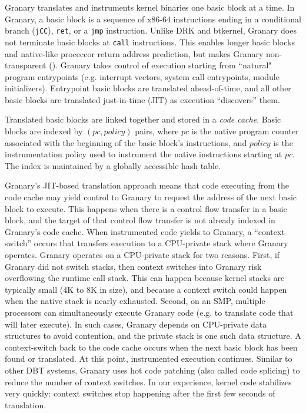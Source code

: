 \documentclass[preprint]{sigplanconf}
\begin{document}
Granary translates and instruments kernel binaries one basic block at a time. In Granary, a basic block is a sequence of x86-64 instructions ending in a conditional branch (\texttt{jCC}), \texttt{ret}, or a \texttt{jmp} instruction. Unlike DRK and btkernel, Granary does not terminate basic blocks at \texttt{call} instructions. This enables longer basic blocks and native-like proceccor return address prediction, but makes Granary non-transparent (). Granary takes control of execution starting from ``natural" program entrypoints (e.g. interrupt vectors, system call entrypoints, module initializers). Entrypoint basic blocks  are translated ahead-of-time, and all other basic blocks are translated just-in-time (JIT) as execution ``discovers'' them.

Translated basic blocks are linked together and stored in a \emph{code cache}. Basic blocks are indexed by $(pc, policy)$ pairs, where $pc$ is the native program counter associated with the beginning of the basic block's instructions, and $policy$ is the instrumentation policy used to instrument the native instructions starting at $pc$. The index is maintained by a globally accessible hash table.

Granary's JIT-based translation approach means that code executing from the code cache may yield control to Granary to request the address of the next basic block to execute. This happens when there is a control flow transfer in a basic block, and the target of that control flow transfer is not already indexed in Granary's code cache. When instrumented code yields to Granary, a ``context switch'' occurs that transfers execution to a CPU-private stack where Granary operates. Granary operates on a CPU-private stack for two reasons. First, if Granary did not switch stacks, then context switches into Granary risk overflowing the runtime call stack. This can happen because kernel stacks are typically small (4K to 8K in size), and because a context switch could happen when the native stack is nearly exhausted. Second, on an SMP, multiple processors can simultaneously execute Granary code (e.g. to translate code that will later execute). In such cases, Granary depends on CPU-private data structures to avoid contention, and the private stack is one such data structure. A context-switch back to the code cache occurs when the next basic block has been found or translated. At this point, instrumented execution continues. Similar to other DBT systems, Granary uses hot code patching (also called code splicing) to reduce the number of context switches. In our experience, kernel code stabilizes very quickly: context switches stop happening after the first few seconds of translation.
\end{document}
